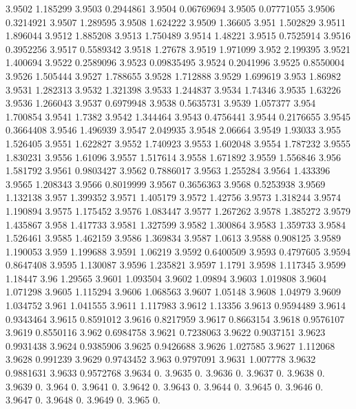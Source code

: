 3.9502  1.185299
3.9503  0.2944861
3.9504  0.06769694
3.9505  0.07771055
3.9506  0.3214921
3.9507  1.289595
3.9508  1.624222
3.9509  1.36605
3.951  1.502829
3.9511  1.896044
3.9512  1.885208
3.9513  1.750489
3.9514  1.48221
3.9515  0.7525914
3.9516  0.3952256
3.9517  0.5589342
3.9518  1.27678
3.9519  1.971099
3.952  2.199395
3.9521  1.400694
3.9522  0.2589096
3.9523  0.09835495
3.9524  0.2041996
3.9525  0.8550004
3.9526  1.505444
3.9527  1.788655
3.9528  1.712888
3.9529  1.699619
3.953  1.86982
3.9531  1.282313
3.9532  1.321398
3.9533  1.244837
3.9534  1.74346
3.9535  1.63226
3.9536  1.266043
3.9537  0.6979948
3.9538  0.5635731
3.9539  1.057377
3.954  1.700854
3.9541  1.7382
3.9542  1.344464
3.9543  0.4756441
3.9544  0.2176655
3.9545  0.3664408
3.9546  1.496939
3.9547  2.049935
3.9548  2.06664
3.9549  1.93033
3.955  1.526405
3.9551  1.622827
3.9552  1.740923
3.9553  1.602048
3.9554  1.787232
3.9555  1.830231
3.9556  1.61096
3.9557  1.517614
3.9558  1.671892
3.9559  1.556846
3.956  1.581792
3.9561  0.9803427
3.9562  0.7886017
3.9563  1.255284
3.9564  1.433396
3.9565  1.208343
3.9566  0.8019999
3.9567  0.3656363
3.9568  0.5253938
3.9569  1.132138
3.957  1.399352
3.9571  1.405179
3.9572  1.42756
3.9573  1.318244
3.9574  1.190894
3.9575  1.175452
3.9576  1.083447
3.9577  1.267262
3.9578  1.385272
3.9579  1.435867
3.958  1.417733
3.9581  1.327599
3.9582  1.300864
3.9583  1.359733
3.9584  1.526461
3.9585  1.462159
3.9586  1.369834
3.9587  1.0613
3.9588  0.908125
3.9589  1.190053
3.959  1.199688
3.9591  1.06219
3.9592  0.6400509
3.9593  0.4797605
3.9594  0.8647408
3.9595  1.130087
3.9596  1.235821
3.9597  1.1791
3.9598  1.117345
3.9599  1.18447
3.96  1.29565
3.9601  1.093504
3.9602  1.09894
3.9603  1.019808
3.9604  1.071298
3.9605  1.115294
3.9606  1.068563
3.9607  1.05148
3.9608  1.04979
3.9609  1.034752
3.961  1.041555
3.9611  1.117983
3.9612  1.13356
3.9613  0.9594489
3.9614  0.9343464
3.9615  0.8591012
3.9616  0.8217959
3.9617  0.8663154
3.9618  0.9576107
3.9619  0.8550116
3.962  0.6984758
3.9621  0.7238063
3.9622  0.9037151
3.9623  0.9931438
3.9624  0.9385906
3.9625  0.9426688
3.9626  1.027585
3.9627  1.112068
3.9628  0.991239
3.9629  0.9743452
3.963  0.9797091
3.9631  1.007778
3.9632  0.9881631
3.9633  0.9572768
3.9634  0.
3.9635  0.
3.9636  0.
3.9637  0.
3.9638  0.
3.9639  0.
3.964  0.
3.9641  0.
3.9642  0.
3.9643  0.
3.9644  0.
3.9645  0.
3.9646  0.
3.9647  0.
3.9648  0.
3.9649  0.
3.965  0.
